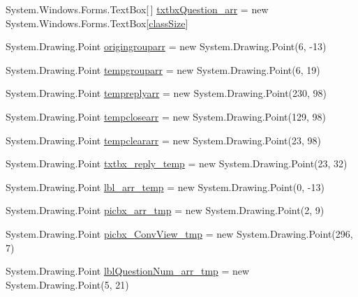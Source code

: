 \begin{DoxyCompactItemize}
\item 
\-System.\-Windows.\-Forms.\-Text\-Box\mbox{[}$\,$\mbox{]} \hyperlink{class_sr_p___classroom_inq_1_1frm_classrrom_inq_ac8b5f7f10341c6c43066881afcbbcaaa}{txtbx\-Question\-\_\-arr} = new \-System.\-Windows.\-Forms.\-Text\-Box\mbox{[}\hyperlink{class_sr_p___classroom_inq_1_1frm_classrrom_inq_a78d9aab335edfe53d39036b9d89928a8}{class\-Size}\mbox{]}
\item 
\-System.\-Drawing.\-Point \hyperlink{class_sr_p___classroom_inq_1_1frm_classrrom_inq_ace01ba3289e75624d67b90f742c195f5}{origingrouparr} = new \-System.\-Drawing.\-Point(6, -\/13)
\item 
\-System.\-Drawing.\-Point \hyperlink{class_sr_p___classroom_inq_1_1frm_classrrom_inq_a6c8231644b9d1f92d08f110b003d621e}{tempgrouparr} = new \-System.\-Drawing.\-Point(6, 19)
\item 
\-System.\-Drawing.\-Point \hyperlink{class_sr_p___classroom_inq_1_1frm_classrrom_inq_ac6007ba00a6fab2fca4b74c0e588e850}{tempreplyarr} = new \-System.\-Drawing.\-Point(230, 98)
\item 
\-System.\-Drawing.\-Point \hyperlink{class_sr_p___classroom_inq_1_1frm_classrrom_inq_a6ad2bdb537cfc35b174dd16dd8e03904}{tempclosearr} = new \-System.\-Drawing.\-Point(129, 98)
\item 
\-System.\-Drawing.\-Point \hyperlink{class_sr_p___classroom_inq_1_1frm_classrrom_inq_a189c01a3745fca62a8250be6a3517894}{tempcleararr} = new \-System.\-Drawing.\-Point(23, 98)
\item 
\-System.\-Drawing.\-Point \hyperlink{class_sr_p___classroom_inq_1_1frm_classrrom_inq_a0b175596cb83997b38795ee916c978f1}{txtbx\-\_\-reply\-\_\-temp} = new \-System.\-Drawing.\-Point(23, 32)
\item 
\-System.\-Drawing.\-Point \hyperlink{class_sr_p___classroom_inq_1_1frm_classrrom_inq_ae3405b23105270490b9685ac52e1b574}{lbl\-\_\-arr\-\_\-temp} = new \-System.\-Drawing.\-Point(0, -\/13)
\item 
\-System.\-Drawing.\-Point \hyperlink{class_sr_p___classroom_inq_1_1frm_classrrom_inq_a019be294be5d02bea4369298d2a135db}{picbx\-\_\-arr\-\_\-tmp} = new \-System.\-Drawing.\-Point(2, 9)
\item 
\-System.\-Drawing.\-Point \hyperlink{class_sr_p___classroom_inq_1_1frm_classrrom_inq_ae49fd425a3c4f52d94af6c20b67f6126}{picbx\-\_\-\-Conv\-View\-\_\-tmp} = new \-System.\-Drawing.\-Point(296, 7)
\item 
\-System.\-Drawing.\-Point \hyperlink{class_sr_p___classroom_inq_1_1frm_classrrom_inq_a9af0d3cc5171be1c8b01ea1e208d61ee}{lbl\-Question\-Num\-\_\-arr\-\_\-tmp} = new \-System.\-Drawing.\-Point(5, 21)

\end{DoxyCompactItemize}
